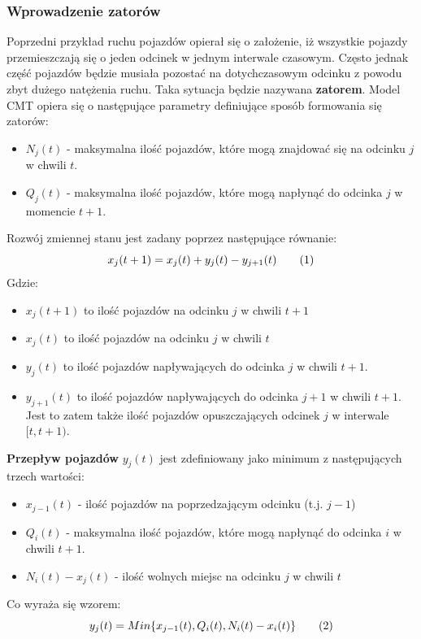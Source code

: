 \documentclass[12pt]{book}
\theoremstyle{plain}
\newcommand\addtag{\refstepcounter{equation}
\renewcommand{\labelenumii}{\theenumii}
\renewcommand{\theenumii}{\theenumi.\arabic{enumii}.}
\tag{\theequation}}
\begin{document}
\subsubsection*{Wprowadzenie zatorów}
Poprzedni przykład ruchu pojazdów opierał się o założenie, iż wszystkie pojazdy przemieszczają się o jeden odcinek w jednym interwale czasowym. Często jednak część pojazdów będzie musiała pozostać na dotychczasowym odcinku z powodu zbyt dużego natężenia ruchu. Taka sytuacja będzie nazywana \textbf{zatorem}. Model CMT opiera się o następujące parametry definiujące sposób formowania się zatorów:
\begin{itemize}
	\item $N_j(t)$ - maksymalna ilość pojazdów, które mogą znajdować się na odcinku $j$ w chwili $t$.
	\item $Q_j(t)$ - maksymalna ilość pojazdów, które mogą napłynąć do odcinka $j$ w momencie $t+1$.
\end{itemize}
Rozwój zmiennej stanu jest zadany poprzez następujące równanie:
\[x_j(t+1)=x_j(t)+y_j(t)-y_{j+1}(t) \addtag \]
Gdzie:
\begin{itemize}
	\item $x_j(t+1)$ to ilość pojazdów na odcinku $j$ w chwili $t+1$
	\item $x_j(t)$ to ilość pojazdów na odcinku $j$ w chwili $t$
	\item $y_j(t)$ to ilość pojazdów napływających do odcinka $j$ w chwili $t+1$.
	\item $y_{j+1}(t)$ to ilość pojazdów napływających do odcinka $j+1$ w chwili $t+1$. Jest to zatem także ilość pojazdów opuszczających odcinek $j$ w interwale $[t,t+1)$.
\end{itemize}
\textbf{Przepływ pojazdów} $y_j(t)$ jest zdefiniowany jako minimum z następujących trzech wartości:
\begin{itemize}
	\item $ x_{j-1}(t) $ - ilość pojazdów na poprzedzającym odcinku (t.j. $j-1$)
	\item $ Q_i(t) $ - maksymalna ilość pojazdów, które mogą napłynąć do odcinka $i$ w chwili $t+1$.
	\item $ N_i(t)-x_j(t) $ - ilość wolnych miejsc na odcinku $j$ w chwili $t$
\end{itemize}
Co wyraża się wzorem:
\[
y_j(t)=Min\{x_{j-1}(t),Q_i(t),N_i(t)-x_i(t)\} \addtag \label{eq_y_CTM}
\]
\end{document}
